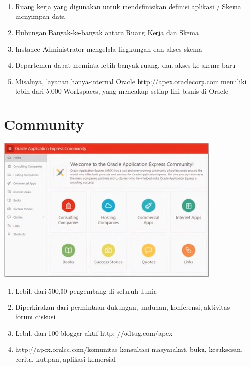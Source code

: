 \documentclass{article}
\begin{document}
\begin{enumerate}
    \item Ruang kerja yang digunakan untuk mendefinisikan definisi aplikasi / Skema menyimpan data
    \item Hubungan Banyak-ke-banyak antara Ruang Kerja dan Skema
    \item Instance Administrator mengelola lingkungan dan akses skema
    \item Departemen dapat meminta lebih banyak ruang, dan akses ke skema baru
    \item Misalnya, layanan hanya-internal Oracle http://apex.oraclecorp.com memiliki lebih dari 5.000 Workspaces, yang mencakup setiap lini bisnis di Oracle

\end{enumerate}
\section{Community}
\begin{center}
    \includegraphics[width=10cm\textwidth]{figure/Community.jpg}
\end{center}
\begin{enumerate}
    \item Lebih dari 500,00 pengembang di seluruh dunia
    \item Diperkirakan dari permintaan dukungan, unduhan, konferensi, aktivitas forum diskusi
    \item Lebih dari 100 blogger aktif http: //odtug.com/apex
    \item http://apex.oralce.com/komunitas konsultasi masyarakat, buku, kesuksesan, cerita, kutipan, aplikasi komersial

\end{enumerate}

\usepackage{Apakah Anda Seorang Siswa Atau Guru SQL, Database Relasional, atau Pengembangan Aplikasi, Anda Dapat Menggunakan Oracle Apex Untuk Sangat Memperkaya Pengalaman Pendidikan Anda?}
\end{document}
